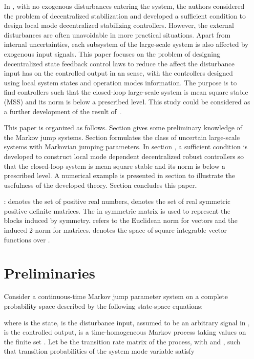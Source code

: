\documentclass[11pt,draftcls,onecolumn]{IEEEtran}
\begin{document}
 In \cite{Xiong2009}, with no exogenous disturbances entering the system, the authors considered the problem of decentralized stabilization and developed a sufficient condition to design local mode decentralized stabilizing controllers. However, the external
disturbances are often unavoidable in more practical situations. Apart from internal uncertainties, each subsystem of the large-scale system is also affected by exogenous input signals.  This paper focuses on the problem of designing decentralized state feedback control laws to reduce the affect the disturbance input has on the controlled output in an  sense, with the controllers designed using local system states and operation modes information.  The purpose is to find controllers such that  the closed-loop large-scale system is  mean square stable (MSS) and  its  norm is below a prescribed level. This study could be considered as a further development of the result of~\cite{Xiong2009}.





This paper is organized as follows. Section \uppercase\expandafter{} gives some preliminary knowledge of the Markov jump systems. Section \uppercase\expandafter{} formulates the class of uncertain large-scale systems with Markovian jumping parameters.  In section \uppercase\expandafter{}, a sufficient condition is developed to construct local mode dependent decentralized robust  controllers so that the closed-loop system is mean square stable  and its  norm is below a prescribed level.
 A numerical example is presented in section \uppercase\expandafter{} to illustrate the usefulness of the developed theory. Section \uppercase\expandafter{} concludes this paper.

:  denotes the set of positive real numbers,  denotes the set of real symmetric positive definite matrices. The  in symmetric matrix is used to represent the blocks induced by symmetry.    refers to the Euclidean norm for vectors and the induced 2-norm for matrices.   denotes the space of square integrable vector functions  over .
\section{Preliminaries}
Consider a continuous-time  Markov jump parameter system  on a complete probability space  described by the following state-space equations:

where  is the state,  is the disturbance input, assumed to be an arbitrary signal in ,  is the controlled output,   is a time-homogeneous Markov process  taking values on the finite set . Let  be the transition rate matrix of the process, with  and , such that transition probabilities of the system mode variable  satisfy
\end{document}
